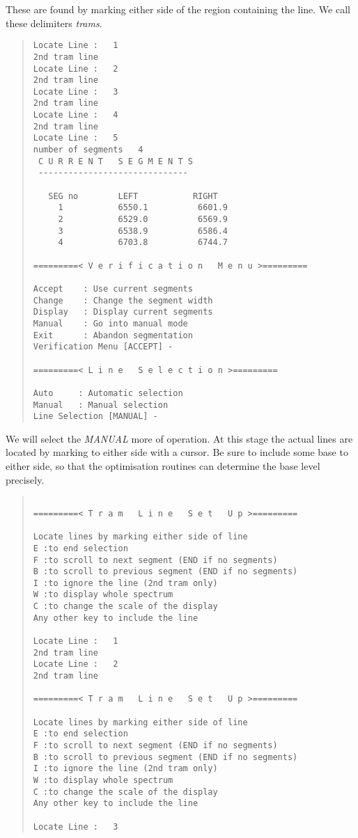These are found by marking either side of the region containing the
line.
We call these delimiters {\em trams}.
\begin{quote}\begin{verbatim}
Locate Line :   1
2nd tram line
Locate Line :   2
2nd tram line
Locate Line :   3
2nd tram line
Locate Line :   4
2nd tram line
Locate Line :   5
number of segments   4
 C U R R E N T   S E G M E N T S
 ------------------------------
 
   SEG no        LEFT           RIGHT
     1           6550.1          6601.9
     2           6529.0          6569.9
     3           6538.9          6586.4
     4           6703.8          6744.7
 
=========< V e r i f i c a t i o n   M e n u >=========
 
Accept    : Use current segments
Change    : Change the segment width
Display   : Display current segments
Manual    : Go into manual mode
Exit      : Abandon segmentation
Verification Menu [ACCEPT] -

=========< L i n e   S e l e c t i o n >=========

Auto     : Automatic selection
Manual   : Manual selection
Line Selection [MANUAL] -
\end{verbatim}\end{quote} 
We will select the {\it MANUAL} more of operation.
At this stage the actual lines are located by marking to either side
with a cursor.
Be sure to include some base to either side, so that the optimisation
routines can determine the base level precisely.
\begin{quote}\begin{verbatim}
 
=========< T r a m   L i n e   S e t   U p >=========
 
Locate lines by marking either side of line
E :to end selection
F :to scroll to next segment (END if no segments)
B :to scroll to previous segment (END if no segments)
I :to ignore the line (2nd tram only)
W :to display whole spectrum
C :to change the scale of the display
Any other key to include the line
 
Locate Line :   1
2nd tram line
Locate Line :   2
2nd tram line
 
=========< T r a m   L i n e   S e t   U p >=========
 
Locate lines by marking either side of line
E :to end selection
F :to scroll to next segment (END if no segments)
B :to scroll to previous segment (END if no segments)
I :to ignore the line (2nd tram only)
W :to display whole spectrum
C :to change the scale of the display
Any other key to include the line
 
Locate Line :   3
\end{verbatim}\end{quote}
